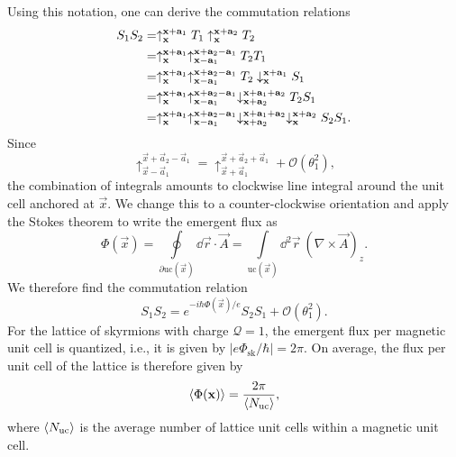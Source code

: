 \documentclass[
    aps,
    prb,
    twocolumn,
    floatfix,
    superscriptaddress,
	10pt
]{revtex4-2}
\begin{document}
Using this notation, one can derive the commutation relations
\begin{align}
	S_1 S_2 &=
	\uparrow_{\vec{x}}^{\vec{x}+\vec{a}_1 } T_1 \uparrow_{\vec{x}}^{\vec{x}+\vec{a}_2 } T_2 
	\notag \\
	&=
	\uparrow_{\vec{x}}^{\vec{x}+\vec{a}_1 } \uparrow_{\vec{x}-\vec{a}_1}^{\vec{x}+\vec{a}_2 -\vec{a}_1} T_2  T_1
	\notag \\
	&=
	\uparrow_{\vec{x}}^{\vec{x}+\vec{a}_1 } \uparrow_{\vec{x}-\vec{a}_1}^{\vec{x}+\vec{a}_2 -\vec{a}_1} T_2 \downarrow_{\vec{x}}^{\vec{x}+\vec{a}_1 } S_1
	\notag \\
	&=
	\uparrow_{\vec{x}}^{\vec{x}+\vec{a}_1 } \uparrow_{\vec{x}-\vec{a}_1}^{\vec{x}+\vec{a}_2 -\vec{a}_1} \downarrow_{\vec{x}+\vec{a}_2}^{\vec{x}+\vec{a}_1+\vec{a}_2 }T_2  S_1
	\notag \\
	&=
	\uparrow_{\vec{x}}^{\vec{x}+\vec{a}_1 } \uparrow_{\vec{x}-\vec{a}_1}^{\vec{x}+\vec{a}_2 -\vec{a}_1} \downarrow_{\vec{x}+\vec{a}_2}^{\vec{x}+\vec{a}_1+\vec{a}_2 }
	\downarrow_{\vec{x}}^{\vec{x}+\vec{a}_2 }
	S_2  S_1 .
\end{align}
Since
\begin{equation}
	\uparrow_{\vec{x}-\vec{a}_1}^{\vec{x}+\vec{a}_2 -\vec{a}_1}
	=
	\uparrow_{\vec{x}+\vec{a}_1}^{\vec{x}+\vec{a}_2 +\vec{a}_1} + \mathcal{O}(\theta_1^2),
\end{equation}
the combination of integrals amounts to clockwise line integral around the unit cell  anchored at $\vec{x}$.
We change this to a counter-clockwise orientation and apply the Stokes theorem to write the emergent flux as
\begin{equation}
	\Phi(\vec{x}) = \oint\limits_{\partial \mathrm{uc}(\vec{x})} \dd\vec{r}\cdot \vec{A} = \int\limits_{\mathrm{uc}(\vec{x})} \dd^2\vec{r}~ (\nabla \times \vec{A})_z .
\end{equation}              
We therefore find the commutation relation
\begin{equation}
	S_1 S_2 = e^{-i\hbar \Phi(\vec{x})/ e} S_2 S_1 + \mathcal{O}(\theta_1^2).
\end{equation}    
For the lattice of skyrmions with charge $\mathcal{Q}=1$, the emergent flux per magnetic unit cell is quantized, i.e., it is given by
$ | e\Phi_\mathrm{sk}/\hbar | = 2 \pi $.
On average, the flux per unit cell of the lattice is therefore given by
\begin{equation}
	\Braket{\Phi(\vec{x})}  =	\frac{2 \pi}{ \Braket{N_\mathrm{uc}}},
\end{equation}
where $\Braket{N_\mathrm{uc}}$ is the average number of lattice unit cells within a magnetic unit cell.
\end{document}
